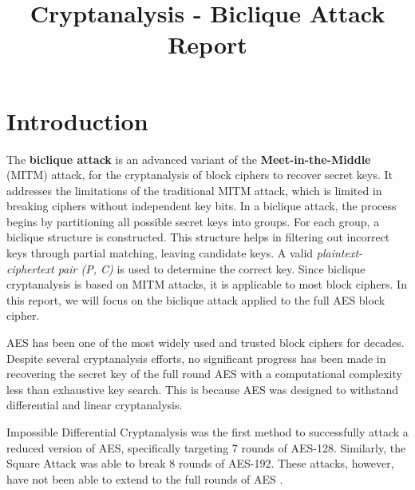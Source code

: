 \documentclass{report}
\title{Cryptanalysis - Biclique Attack Report} %
\begin{document}

\subject{INFO-F-537: Cryptanalysis} %




\buildmargins %
\buildcover %
\toc %


\section{Introduction}
The \textbf{biclique attack} is an advanced variant of the \textbf{Meet-in-the-Middle} (MITM) attack, for the cryptanalysis of block ciphers to recover secret keys. It addresses the limitations of the traditional MITM attack, which is limited in breaking ciphers without independent key bits. In a biclique attack, the process begins by partitioning all possible secret keys into groups. For each group, a biclique structure is constructed. This structure helps in filtering out incorrect keys through partial matching, leaving candidate keys. A valid \emph{plaintext-ciphertext pair (P, C)} is used to determine the correct key. Since biclique cryptanalysis is based on MITM attacks, it is applicable to most block ciphers. In this report, we will focus on the biclique attack applied to the full AES block cipher. 

AES has been one of the most widely used and trusted block ciphers for decades. Despite several cryptanalysis efforts, no significant progress has been made in recovering the secret key of the full round AES with a computational complexity less than exhaustive key search. This is because AES was designed to withstand differential and linear cryptanalysis. \cite{bogdanov2011biclique} 

Impossible Differential Cryptanalysis was the first method to successfully attack a reduced version of AES, specifically targeting 7 rounds of AES-128. Similarly, the Square Attack was able to break 8 rounds of AES-192. These attacks, however, have not been able to extend to the full rounds of AES \cite{bogdanov2011biclique}. 
\end{document}
